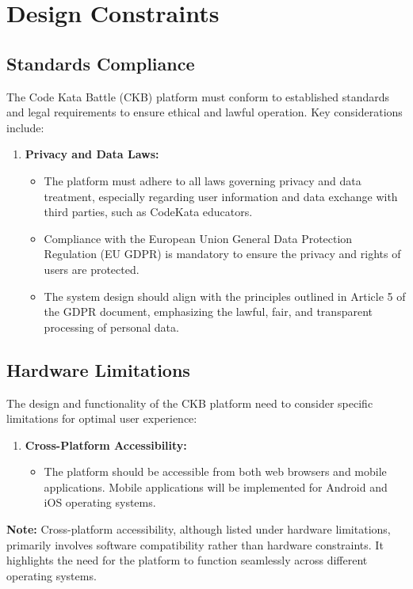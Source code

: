 \section{Design Constraints}
\label{sec:design_constraints}%

\subsection{Standards Compliance}
\label{subsec:standards_compliance}%
The Code Kata Battle (CKB) platform must conform to established standards and legal requirements to ensure ethical and lawful operation. Key considerations include:

\begin{enumerate}
    \item \textbf{Privacy and Data Laws:}
          \begin{itemize}
              \item The platform must adhere to all laws governing privacy and data treatment, especially regarding user information and data exchange with third parties, such as CodeKata educators.
              \item Compliance with the European Union General Data Protection Regulation (EU GDPR) is mandatory to ensure the privacy and rights of users are protected.
              \item The system design should align with the principles outlined in Article 5 of the GDPR document, emphasizing the lawful, fair, and transparent processing of personal data.
          \end{itemize}
\end{enumerate}

\subsection{Hardware Limitations}
\label{subsec:hardware_limitations}%
The design and functionality of the CKB platform need to consider specific limitations for optimal user experience:

\begin{enumerate}
    \item \textbf{Cross-Platform Accessibility:}
          \begin{itemize}
              \item The platform should be accessible from both web browsers and mobile applications. Mobile applications will be implemented for Android and iOS operating systems.
          \end{itemize}
\end{enumerate}
\textbf{Note:} Cross-platform accessibility, although listed under hardware limitations, primarily involves software compatibility rather than hardware constraints. It highlights the need for the platform to function seamlessly across different operating systems.

